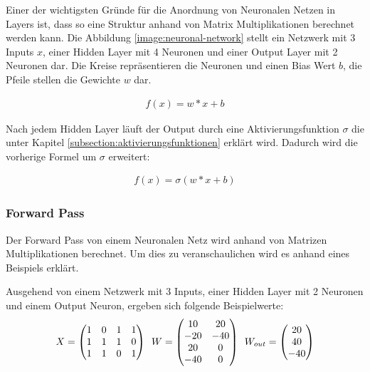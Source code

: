 Einer der wichtigsten Gründe für die Anordnung von Neuronalen Netzen in Layers ist, dass so eine Struktur anhand von Matrix Multiplikationen
berechnet werden kann. Die Abbildung \ref{image:neuronal-network} stellt ein Netzwerk mit 3 Inputs $ x $, einer Hidden Layer mit 4 Neuronen
und einer Output Layer mit 2 Neuronen dar. Die Kreise repräsentieren die Neuronen und einen Bias Wert $ b $,
die Pfeile stellen die Gewichte $ w $ dar.

\begin{align}
  f(x) = w*x + b
\end{align}

Nach jedem Hidden Layer läuft der Output durch eine Aktivierungsfunktion $ \sigma $ die unter Kapitel \ref{subsection:aktivierungsfunktionen} erklärt wird.
Dadurch wird die vorherige Formel um $ \sigma $ erweitert:

\begin{align}
  f(x) = \sigma( w*x + b)
\end{align}

\subsubsection{Forward Pass}
Der Forward Pass von einem Neuronalen Netz wird anhand von Matrizen Multiplikationen berechnet. Um dies zu veranschaulichen wird
es anhand eines Beispiels erklärt.

Ausgehend von einem Netzwerk mit 3 Inputs, einer Hidden Layer mit 2 Neuronen und einem Output Neuron, ergeben sich folgende Beispielwerte:
\begin{equation} 
  \vspace{5pt}
  X = \begin{pmatrix}
    1 &0 &1 &1 \\
    1 &1 &1 &0 \\
    1 &1 &0 &1
  \end{pmatrix} 
  \hspace{5pt}
  W = \begin{pmatrix}
    10 &20 \\
    -20 &-40 \\
    20 &0 \\
    -40 &0
  \end{pmatrix}
  \hspace{5pt}
  W_{out} = \begin{pmatrix}
    20 \\
    40 \\
    -40
  \end{pmatrix}
\end{equation}


